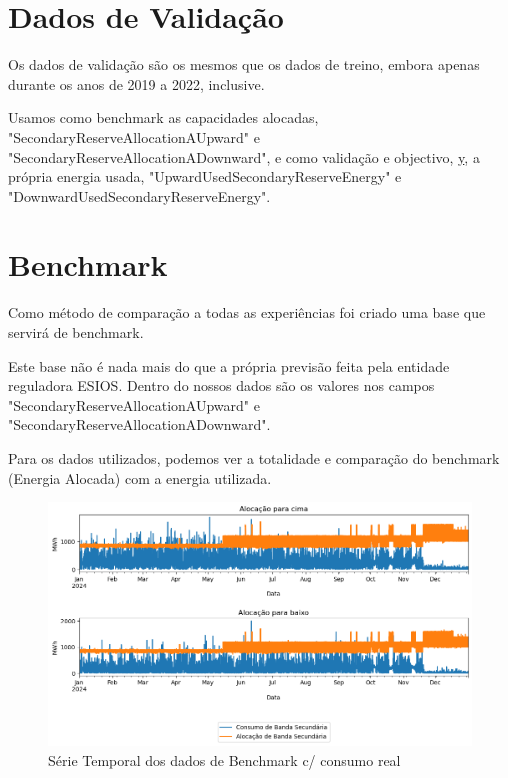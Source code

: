 \section{Dados de Validação}
Os dados de validação são os mesmos que os dados de treino, embora apenas durante os anos de 2019 a 2022, inclusive.\par
Usamos como benchmark as capacidades alocadas, "SecondaryReserveAllocationAUpward" e "SecondaryReserveAllocationADownward", e como validação e objectivo, \hyperref[se:metneuralnet]{y}, a própria energia usada, "UpwardUsedSecondaryReserveEnergy" e "DownwardUsedSecondaryReserveEnergy".

\section{Benchmark}

Como método de comparação a todas as experiências foi criado uma base que servirá de benchmark.\par
Este base não é nada mais do que a própria previsão feita pela entidade reguladora \gls{ESIOS}. Dentro do nossos dados são os valores nos campos "SecondaryReserveAllocationAUpward" e "SecondaryReserveAllocationADownward".\par
Para os dados utilizados, podemos ver a totalidade e comparação do benchmark (Energia Alocada) com a energia utilizada.\par

\begin{figure}[H]
    \centering
    \includegraphics[width=\textwidth]{plots/benchmark_alocacoes_validacao.png}
    \caption{Série Temporal dos dados de Benchmark c/ consumo real}
    \label{fig:benchmarktimeseries}
\end{figure}


